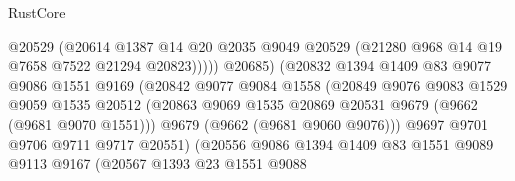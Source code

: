\begin{lexlean}{RustCore}
\begin{coremodule}
                                        @20529
                                        (@20614
                                          @1387
                                          @14
                                          @20
                                          @2035
                                          @9049
                                          @20529
                                          (@21280 @968 @14 @19 @7658 @7522 @21294 @20823)))))
                                  @20685)
                                (@20832
                                  @1394
                                  @1409
                                  @83
                                  @9077
                                  @9086
                                  @1551
                                  @9169
                                  (@20842
                                    @9077
                                    @9084
                                    @1558
                                    (@20849
                                      @9076
                                      @9083
                                      @1529
                                      @9059
                                      @1535
                                      @20512
                                      (@20863
                                        @9069
                                        @1535
                                        @20869
                                        @20531
                                        @9679
                                        (@9662 (@9681 @9070 @1551)))
                                      @9679
                                      (@9662 (@9681 @9060 @9076)))
                                    @9697
                                    @9701
                                    @9706
                                    @9711
                                    @9717
                                    @20551)
                                  (@20556
                                    @9086
                                    @1394
                                    @1409
                                    @83
                                    @1551
                                    @9089
                                    @9113
                                    @9167
                                    (@20567
                                      @1393
                                      @23
                                      @1551
                                      @9088

\end{coremodule}
\end{lexlean}
